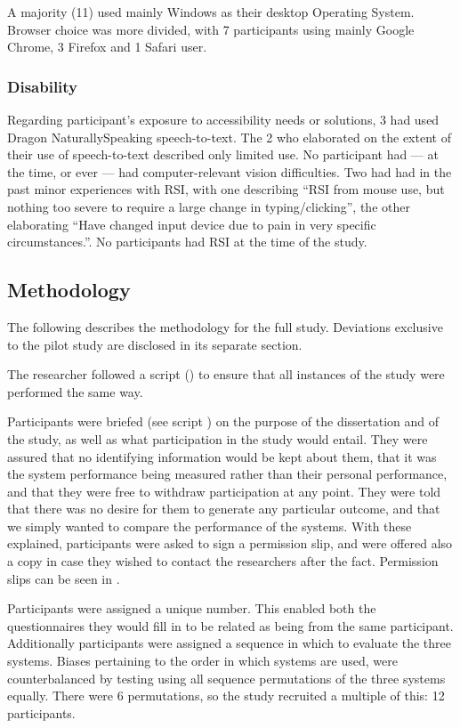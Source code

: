 \documentclass[11pt,openright,a4paper]{report}
\begin{document}
A majority (11) used mainly Windows as their desktop Operating System. Browser choice was more divided, with 7 participants using mainly Google Chrome, 3 Firefox and 1 Safari user.

\subsubsection{Disability}
Regarding participant's exposure to accessibility needs or solutions, 3 had used Dragon NaturallySpeaking speech-to-text. The 2 who elaborated on the extent of their use of speech-to-text described only limited use. No participant had --- at the time, or ever --- had computer-relevant vision difficulties. Two had had in the past minor experiences with RSI, with one describing ``RSI from mouse use, but nothing too severe to require a large change in typing/clicking'', the other elaborating ``Have changed input device due to pain in very specific circumstances.''. No participants had RSI at the time of the study.

\subsection{Methodology}
The following describes the methodology for the full study. Deviations exclusive to the pilot study are disclosed in its separate section.

The researcher followed a script () to ensure that all instances of the study were performed the same way.

Participants were briefed (see script ) on the purpose of the dissertation and of the study, as well as what participation in the study would entail. They were assured that no identifying information would be kept about them, that it was the system performance being measured rather than their personal performance, and that they were free to withdraw participation at any point. They were told that there was no desire for them to generate any particular outcome, and that we simply wanted to compare the performance of the systems. With these explained, participants were asked to sign a permission slip, and were offered also a copy in case they wished to contact the researchers after the fact. Permission slips can be seen in .

Participants were assigned a unique number. This enabled both the questionnaires they would fill in to be related as being from the same participant. Additionally participants were assigned a sequence in which to evaluate the three systems. Biases pertaining to the order in which systems are used, were counterbalanced by testing using all sequence permutations of the three systems equally. There were 6 permutations, so the study recruited a multiple of this: 12 participants.
\end{document}
